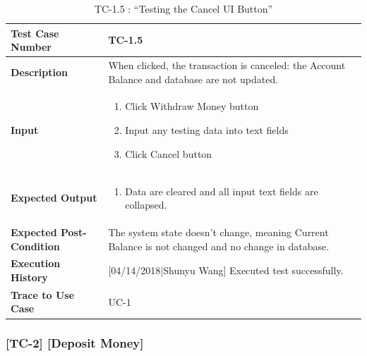 \documentclass[12pt]{article}
\begin{document}
\begin{table}[H]
\caption{TC-1.5 : “Testing the Cancel UI Button”}
\begin{center}
\begin{tabular}{|p{5.5	cm}|p{11cm}|}
\hline
\bf Test Case Number & 
TC-1.5 \\
\hline
\bf Description & 
When clicked, the transaction is canceled: the Account Balance and database are not updated.\\
\hline
\bf Input & 
\begin{enumerate}
  \item Click Withdraw Money button
  \item Input any testing data into text fields
  \item Click Cancel button
\end{enumerate} \\
\hline
\bf Expected Output & 
\begin{enumerate}
  \item Data are cleared and all input text fields are collapsed.
\end{enumerate} \\
\hline
\bf Expected Post-Condition & 
The system state doesn’t change, meaning Current Balance is not changed and no change in database.\\
\hline
\bf Execution History & 
[04/14/2018|Shunyu Wang] Executed test successfully.\\
\hline
\bf Trace to Use Case & 
UC-1\\
\hline

\end{tabular}
\end{center}
\end{table}

\subsubsection{[TC-2] [Deposit Money]} \label{tc:2}
\end{document}

